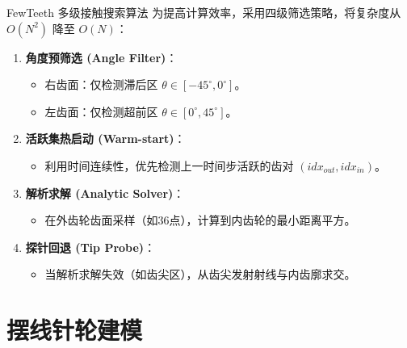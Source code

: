\documentclass[aspectratio=169,10pt,xcolor=table]{ctexbeamer}
\begin{document}
\begin{frame}{FewTeeth 多级接触搜索算法}
  为提高计算效率，采用四级筛选策略，将复杂度从 $O(N^2)$ 降至 $O(N)$：
  
  \begin{enumerate}
      \item \textbf{角度预筛选 (Angle Filter)}：
      \begin{itemize}
          \item 右齿面：仅检测滞后区 $\theta \in [-45^\circ, 0^\circ]$。
          \item 左齿面：仅检测超前区 $\theta \in [0^\circ, 45^\circ]$。
      \end{itemize}
      
      \item \textbf{活跃集热启动 (Warm-start)}：
      \begin{itemize}
          \item 利用时间连续性，优先检测上一时间步活跃的齿对 $(idx_{out}, idx_{in})$。
      \end{itemize}
      
      \item \textbf{解析求解 (Analytic Solver)}：
      \begin{itemize}
          \item 在外齿轮齿面采样（如36点），计算到内齿轮的最小距离平方。
      \end{itemize}
      
      \item \textbf{探针回退 (Tip Probe)}：
      \begin{itemize}
          \item 当解析求解失效（如齿尖区），从齿尖发射射线与内齿廓求交。
      \end{itemize}
  \end{enumerate}
\end{frame}

\section{摆线针轮建模}
\end{document}
